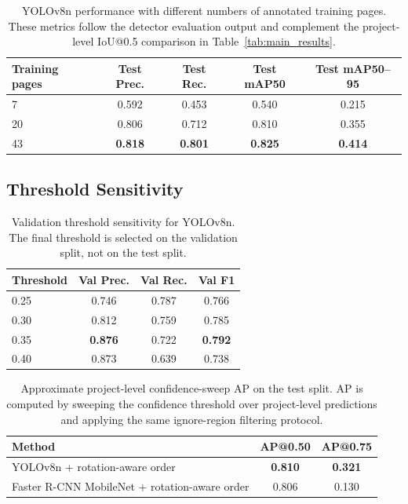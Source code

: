 \documentclass[12pt]{article}
\begin{document}
\begin{table}[t]
\centering
\caption{YOLOv8n performance with different numbers of annotated training pages. These metrics follow the detector evaluation output and complement the project-level IoU@0.5 comparison in Table~\ref{tab:main_results}.}
\label{tab:train_size}
\begin{tabular}{lcccc}
\toprule
Training pages & Test Prec. & Test Rec. & Test mAP50 & Test mAP50--95 \\
\midrule
7 & 0.592 & 0.453 & 0.540 & 0.215 \\
20 & 0.806 & 0.712 & 0.810 & 0.355 \\
43 & \textbf{0.818} & \textbf{0.801} & \textbf{0.825} & \textbf{0.414} \\
\bottomrule
\end{tabular}
\end{table}

\subsection{Threshold Sensitivity}
\begin{table}[t]
\centering
\caption{Validation threshold sensitivity for YOLOv8n. The final threshold is selected on the validation split, not on the test split.}
\label{tab:threshold}
\begin{tabular}{lccc}
\toprule
Threshold & Val Prec. & Val Rec. & Val F1 \\
\midrule
0.25 & 0.746 & 0.787 & 0.766 \\
0.30 & 0.812 & 0.759 & 0.785 \\
0.35 & \textbf{0.876} & 0.722 & \textbf{0.792} \\
0.40 & 0.873 & 0.639 & 0.738 \\
\bottomrule
\end{tabular}
\end{table}


\begin{table}[t]
\centering
\caption{Approximate project-level confidence-sweep AP on the test split. AP is computed by sweeping the confidence threshold over project-level predictions and applying the same ignore-region filtering protocol.}
\label{tab:project_ap}
\begin{tabular}{lcc}
\toprule
Method & AP@0.50 & AP@0.75 \\
\midrule
YOLOv8n + rotation-aware order & \textbf{0.810} & \textbf{0.321} \\
Faster R-CNN MobileNet + rotation-aware order & 0.806 & 0.130 \\
\bottomrule
\end{tabular}
\end{table}
\end{document}
